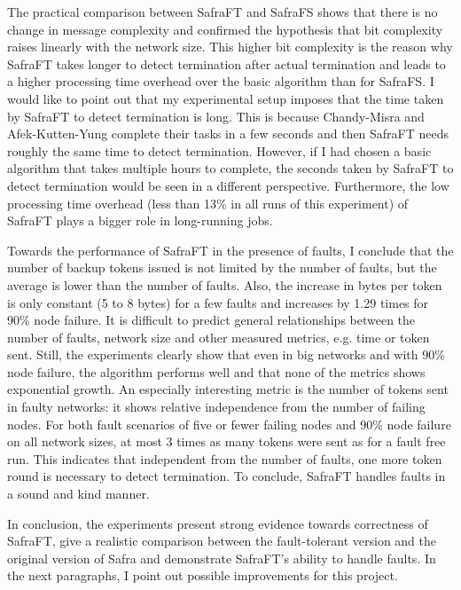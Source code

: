 The practical comparison between SafraFT and SafraFS shows that there is no change in message complexity and confirmed the hypothesis that bit complexity raises linearly with the network size.
This higher bit complexity is the reason why SafraFT takes longer to detect termination after actual termination and leads to a higher processing time overhead over the basic algorithm than for SafraFS.
I would like to point out that my experimental setup imposes that the time taken by SafraFT to detect termination is long.
This is because Chandy-Misra and Afek-Kutten-Yung complete their tasks in a few seconds and then SafraFT needs roughly the same time to detect termination.
However, if I had chosen a basic algorithm that takes multiple hours to complete, the seconds taken by SafraFT to detect termination would be seen in a different perspective.
Furthermore, the low processing time overhead (less than 13\% in all runs of this experiment)  %
of SafraFT plays a bigger role in long-running jobs.

Towards the performance of SafraFT in the presence of faults, I conclude that the number of backup tokens issued is not limited by the number of faults, but the average is lower than the number of faults.
Also, the increase in bytes per token is only constant (5 to 8 bytes) for a few faults and increases by 1.29 times for 90\% node failure.  %
It is difficult to predict general relationships between the number of faults, network size and other measured metrics, e.g. time or token sent.
Still, the experiments clearly show that even in big networks and with 90\% node failure, the algorithm performs well and that none of the metrics shows exponential growth.
An especially interesting metric is the number of tokens sent in faulty networks: it shows relative independence from the number of failing nodes.
For both fault scenarios of five or fewer failing nodes and 90\% node failure on all network sizes, at most 3 times as many tokens were sent as for a fault free run. %
This indicates that independent from the number of faults, one more token round is necessary to detect termination.
To conclude, SafraFT handles faults in a sound and kind manner.

In conclusion, the experiments present strong evidence towards correctness of SafraFT, give a realistic comparison between the fault-tolerant version and the original version of Safra and demonstrate SafraFT's ability to handle faults.
In the next paragraphs, I point out possible improvements for this project.

